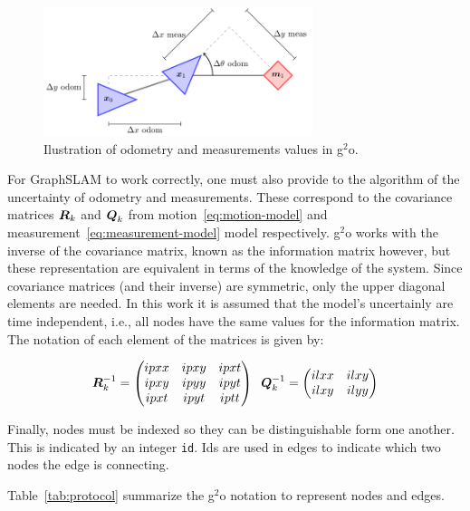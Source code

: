 \begin{figure}[htbp!]
    \centering
    \includegraphics[width=0.7\textwidth]{tikz/protocol.pdf}
    \caption{Ilustration of odometry and measurements values in g$^2$o.}
    \label{fig:protocol}
\end{figure}

For GraphSLAM to work correctly, one must also provide to the algorithm of the uncertainty of odometry and measurements. These correspond to the covariance matrices $\boldsymbol{R}_k$ and $\boldsymbol{Q}_k$ from motion~\eqref{eq:motion-model} and measurement~\eqref{eq:measurement-model} model respectively. g$^2$o works with the inverse of the covariance matrix, known as the information matrix however, but these representation are equivalent in terms of the knowledge of the system. Since covariance matrices (and their inverse) are symmetric, only the upper diagonal elements are needed. In this work it is assumed that the model's uncertainly are time independent, i.e., all nodes have the same values for the information matrix. The notation of each element of the matrices is given by:

\begin{equation}
    \boldsymbol{R}^{-1}_k = \begin{pmatrix}
    ipxx & ipxy & ipxt\\
    ipxy & ipyy & ipyt\\
    ipxt & ipyt & iptt
    \end{pmatrix} \;\;
    \boldsymbol{Q}^{-1}_k = \begin{pmatrix}
    ilxx & ilxy\\
    ilxy & ilyy
    \end{pmatrix} 
    \label{eq:info-matrices}
\end{equation}

Finally, nodes must be indexed so they can be distinguishable form one another. This is indicated by an integer \texttt{id}. Ids are used in edges to indicate which two nodes the edge is connecting.

Table~\ref{tab:protocol} summarize the g$^2$o notation to represent nodes and edges.

